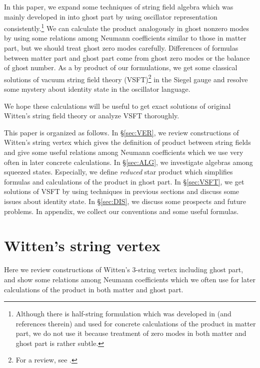 \documentclass[12pt,a4paper]{article}
\begin{document}
In this paper, we expand some techniques of string field algebra which was mainly developed in \cite{RSZ}\cite{FO} into ghost part by using oscillator representation consistently.\footnote{
Although there is  half-string formulation which was developed in \cite{HALF}\cite{RSZ}\cite{KOM} (and references therein) and used for concrete calculations of the \myHighlight{$\star$}\coordHE{} product in matter part, we do not use it because treatment of zero modes in both matter and ghost part is rather subtle.}
We can calculate the \myHighlight{$\star$}\coordHE{} product analogously in \coordHE{} ghost nonzero modes by using some relations among Neumann coefficients similar to those in matter part, but we should treat ghost zero modes carefully. Differences of formulas between matter part and ghost part come from ghost zero modes or the balance of ghost number. As a by product of our formulations, we get some classical solutions of vacuum string field theory (VSFT)\footnote{
	For a review, see \cite{VSFT}.
} in the Siegel gauge and resolve some mystery about identity state in the oscillator language.

We hope these calculations will be useful to get exact solutions of original Witten's string field theory \cite{Witten} or analyze VSFT thoroughly.

This paper is organized as follows.
In \S \ref{sec:VER}, we review constructions of Witten's string vertex which gives the definition of \myHighlight{$\star$}\coordHE{} product between string fields and give some useful relations among Neumann coefficients which we use very often in later concrete calculations.
In \S \ref{sec:ALG}, we investigate algebras among squeezed states. Especially, we define {\it reduced} star product which simplifies formulas and calculations of the \myHighlight{$\star$}\coordHE{} product in ghost part.
In \S \ref{sec:VSFT}, we get solutions of VSFT by using techniques in previous sections and discuss some issues about identity state.
In \S \ref{sec:DIS}, we discuss some prospects and future problems.
In appendix, we collect our conventions and some useful formulas.


\section{Witten's string vertex \label{sec:VER}}

Here we review constructions of Witten's 3-string vertex including ghost part, and show some relations among Neumann coefficients which we often use for later calculations of the \myHighlight{$\star$}\coordHE{} product in both matter and ghost part.
\end{document}
